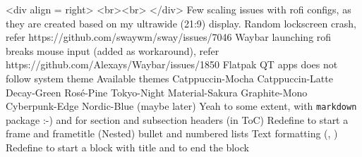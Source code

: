 {}\markdownRendererInterblockSeparator
{}<div align = right> <br><br>\markdownRendererInterblockSeparator
{} </div>\markdownRendererInterblockSeparator
{}\markdownRendererInterblockSeparator
{}\markdownRendererUlBegin
\markdownRendererUlItem [] Few scaling issues with rofi configs, as they are created based on my ultrawide (21:9) display.\markdownRendererUlItemEnd 
\markdownRendererUlItem [] Random lockscreen crash, refer https://github.com/swaywm/sway/issues/7046\markdownRendererUlItemEnd 
\markdownRendererUlItem [] Waybar launching rofi breaks mouse input (added  as workaround), refer https://github.com/Alexays/Waybar/issues/1850\markdownRendererUlItemEnd 
\markdownRendererUlItem [] Flatpak QT apps does not follow system theme\markdownRendererUlItemEnd 
\markdownRendererUlItem Available themes\markdownRendererUlItemEnd 
\markdownRendererUlItem [x] Catppuccin-Mocha\markdownRendererUlItemEnd 
\markdownRendererUlItem [x] Catppuccin-Latte\markdownRendererUlItemEnd 
\markdownRendererUlItem [x] Decay-Green\markdownRendererUlItemEnd 
\markdownRendererUlItem [x] Rosé-Pine\markdownRendererUlItemEnd 
\markdownRendererUlItem [x] Tokyo-Night\markdownRendererUlItemEnd 
\markdownRendererUlItem [x] Material-Sakura\markdownRendererUlItemEnd 
\markdownRendererUlItem [x] Graphite-Mono\markdownRendererUlItemEnd 
\markdownRendererUlItem [x] Cyberpunk-Edge\markdownRendererUlItemEnd 
\markdownRendererUlItem [] Nordic-Blue (maybe later)\markdownRendererUlItemEnd 
\markdownRendererUlItem Yeah to some extent, with \texttt{markdown} package :-)\markdownRendererUlItemEnd 
\markdownRendererUlItem \markdownRendererStrongEmphasis{$\hash$} and \markdownRendererStrongEmphasis{$\hash\hash$} for section and subsection headers (in ToC)\markdownRendererUlItemEnd 
\markdownRendererUlItem Redefine \markdownRendererStrongEmphasis{$\hash\hash\hash$} to start a frame and frametitle\markdownRendererUlItemEnd 
\markdownRendererUlItem (Nested) bullet and numbered lists\markdownRendererUlItemEnd 
\markdownRendererUlItem Text formatting (, )\markdownRendererUlItemEnd 
\markdownRendererUlItem Redefine \markdownRendererStrongEmphasis{$\hash\hash\hash\hash$} to start a block with title \linebreak and \markdownRendererStrongEmphasis{\texttt{-{}-{}-{}-}} to end the block\markdownRendererUlItemEnd 
